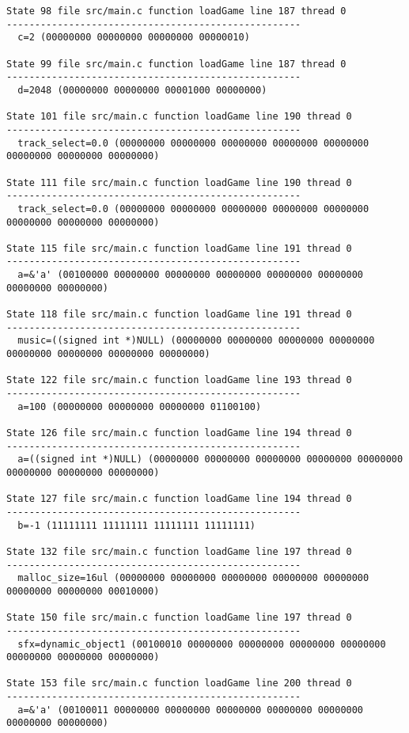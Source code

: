 \begin{verbatim}
State 98 file src/main.c function loadGame line 187 thread 0
----------------------------------------------------
  c=2 (00000000 00000000 00000000 00000010)

State 99 file src/main.c function loadGame line 187 thread 0
----------------------------------------------------
  d=2048 (00000000 00000000 00001000 00000000)

State 101 file src/main.c function loadGame line 190 thread 0
----------------------------------------------------
  track_select=0.0 (00000000 00000000 00000000 00000000 00000000 00000000 00000000 00000000)

State 111 file src/main.c function loadGame line 190 thread 0
----------------------------------------------------
  track_select=0.0 (00000000 00000000 00000000 00000000 00000000 00000000 00000000 00000000)

State 115 file src/main.c function loadGame line 191 thread 0
----------------------------------------------------
  a=&'a' (00100000 00000000 00000000 00000000 00000000 00000000 00000000 00000000)

State 118 file src/main.c function loadGame line 191 thread 0
----------------------------------------------------
  music=((signed int *)NULL) (00000000 00000000 00000000 00000000 00000000 00000000 00000000 00000000)

State 122 file src/main.c function loadGame line 193 thread 0
----------------------------------------------------
  a=100 (00000000 00000000 00000000 01100100)

State 126 file src/main.c function loadGame line 194 thread 0
----------------------------------------------------
  a=((signed int *)NULL) (00000000 00000000 00000000 00000000 00000000 00000000 00000000 00000000)

State 127 file src/main.c function loadGame line 194 thread 0
----------------------------------------------------
  b=-1 (11111111 11111111 11111111 11111111)

State 132 file src/main.c function loadGame line 197 thread 0
----------------------------------------------------
  malloc_size=16ul (00000000 00000000 00000000 00000000 00000000 00000000 00000000 00010000)

State 150 file src/main.c function loadGame line 197 thread 0
----------------------------------------------------
  sfx=dynamic_object1 (00100010 00000000 00000000 00000000 00000000 00000000 00000000 00000000)

State 153 file src/main.c function loadGame line 200 thread 0
----------------------------------------------------
  a=&'a' (00100011 00000000 00000000 00000000 00000000 00000000 00000000 00000000)


\end{verbatim}
